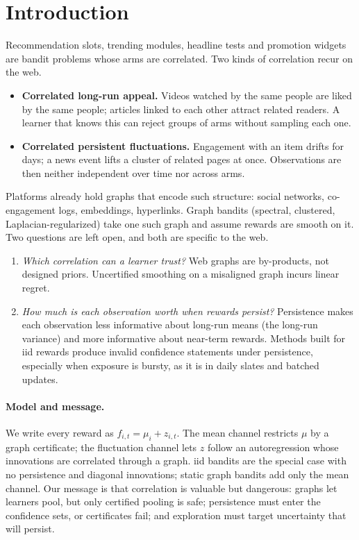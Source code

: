 \documentclass[11pt]{article}
\theoremstyle{definition}
\theoremstyle{remark}
\begin{document}
\tableofcontents
\newpage

\section{Introduction}

Recommendation slots, trending modules, headline tests and promotion widgets are bandit problems whose arms are correlated. Two kinds of correlation recur on the web.
\begin{itemize}
\item \textbf{Correlated long-run appeal.} Videos watched by the same people are liked by the same people; articles linked to each other attract related readers. A learner that knows this can reject groups of arms without sampling each one.
\item \textbf{Correlated persistent fluctuations.} Engagement with an item drifts for days; a news event lifts a cluster of related pages at once. Observations are then neither independent over time nor across arms.
\end{itemize}
Platforms already hold graphs that encode such structure: social networks, co-engagement logs, embeddings, hyperlinks. Graph bandits (spectral, clustered, Laplacian-regularized) take one such graph and assume rewards are smooth on it. Two questions are left open, and both are specific to the web.
\begin{enumerate}
\item \emph{Which correlation can a learner trust?} Web graphs are by-products, not designed priors. Uncertified smoothing on a misaligned graph incurs linear regret.
\item \emph{How much is each observation worth when rewards persist?} Persistence makes each observation less informative about long-run means (the long-run variance) and more informative about near-term rewards. Methods built for iid rewards produce invalid confidence statements under persistence, especially when exposure is bursty, as it is in daily slates and batched updates.
\end{enumerate}

\paragraph{Model and message.} We write every reward as $f_{i,t}=\mu_i+z_{i,t}$. The mean channel restricts $\mu$ by a graph certificate; the fluctuation channel lets $z$ follow an autoregression whose innovations are correlated through a graph. iid bandits are the special case with no persistence and diagonal innovations; static graph bandits add only the mean channel. Our message is that correlation is valuable but dangerous: graphs let learners pool, but only certified pooling is safe; persistence must enter the confidence sets, or certificates fail; and exploration must target uncertainty that will persist.
\end{document}
